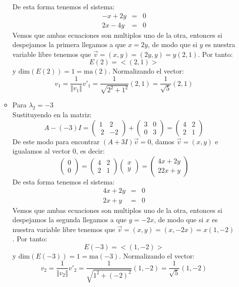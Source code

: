 \begin{itemize}
\begin{itemize}
        De esta forma tenemos el sistema:
        \begin{eqnarray*}
        -x+2y&=&0\\
        2x-4y&=&0
        \end{eqnarray*}
        Vemos que ambas ecuaciones son multiplos uno de la otra, entonces si despejamos la primera llegamos a que $x=2y$, de modo que si $y$ es nuestra variable libre tenemos que $\vec{v}=(x,y)=(2y,y)=y(2,1)$. Por tanto:
        \[E(2)=<(2,1)>\]
        y $\text{dim}(E(2))=1=\text{ma}(2)$. 
        Normalizando el vector:
        \[v_1=\frac{1}{\Vert v_1\Vert}v'_1=\frac{1}{\sqrt{2^2+1^2}}(2,1)=\frac{1}{\sqrt{5}}(2,1)\]
        
        
        \item Para $\lambda_2=-3$\\
        Sustituyendo en la matriz:
        \[A-(-3)I=\begin{pmatrix}1&2\\ \:2&-2\end{pmatrix}+ \begin{pmatrix}3&0\\ 0&3\end{pmatrix}=\begin{pmatrix}4&2\\ 2&1\end{pmatrix}\]
        De este modo para encontrar $(A+3I)\Vec{v}=0$, damos $\vec{v}=(x,y)$ e igualamos al vector 0, es decir:
        \[\begin{pmatrix}0\\0\end{pmatrix}=\begin{pmatrix}4&2\\ 2&1\end{pmatrix}\begin{pmatrix}x\\y\end{pmatrix}=\begin{pmatrix}4x+2y\\22x+y\end{pmatrix}\]
        De esta forma tenemos el sistema:
        \begin{eqnarray*}
        4x+2y&=&0\\
        2x+y&=&0
        \end{eqnarray*}
        Vemos que ambas ecuaciones son multiplos uno de la otra, entonces si despejamos la segunda llegamos a que $y=-2x$, de modo que si $x$ es nuestra variable libre tenemos que $\vec{v}=(x,y)=(x,-2x)=x(1,-2)$. Por tanto:
        \[E(-3)=<(1,-2)>\]
        y $\text{dim}(E(-3))=1=\text{ma}(-3)$. 
        Normalizando el vector:
        \[v_2=\frac{1}{\Vert v_2\Vert}v'_2=\frac{1}{\sqrt{1^2+(-2)^2}}(1,-2)=\frac{1}{\sqrt{5}}(1,-2)\]
        

\end{itemize}
\end{itemize}
